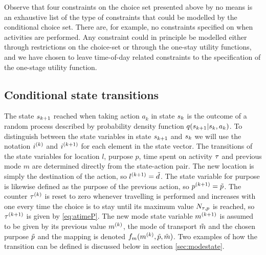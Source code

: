 Observe that four constraints on the choice set presented above by no means is an exhaustive list of the type of constraints that could be modelled by the conditional choice set. There are, for example, no constraints specified on when activities are performed. Any constraint could in principle be modelled either through restrictions on the choice-set or through the one-stay utility functions, and we have chosen to leave time-of-day related constraints to the specification of the one-stage utility function. 
\subsection{Conditional state transitions}
The state $s_{k+1}$ reached when taking action $a_k$ in state $s_{k}$ is the outcome of a random process described by probability density function $q(s_{k+1}|s_{k},a_k)$. To distinguish between the state variables in state $s_{k+1}$ and $s_{k}$ we will use the notation $i^{(k)}$ and $i^{(k+1)}$ for each element in the state vector.
The transitions of the state variables for location $l$, purpose $p$, time spent on activity $\tau$ and previous mode $m$ are determined directly from the state-action pair. The new location is simply the destination of the action, so $l^{(k+1)} = \tilde{d}$. The state variable for purpose is likewise defined as the purpose of the previous action, so $p^{(k+1)} = \tilde{p}$. 
The counter $\tau^{(k)}$ is reset to zero whenever travelling is performed and increases with one every time the choice is to stay until its maximum value $N_{\tau,p}$ is reached, so $\tau^{(k+1)}$ is given by \eqref{eq:atimeP}.
The new mode state variable $m^{(k+1)}$ is assumed to be given by its previous value $m^{(k)}$, the mode of transport $\tilde{m}$ and the chosen purpose $\tilde{p}$ and the mapping is denoted $f_m(m^{(k)},\tilde{p},\tilde{m})$. Two examples of how the transition can be defined is discussed below in section \ref{sec:modestate}.

